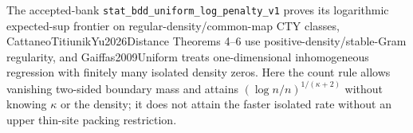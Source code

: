 The accepted-bank \texttt{stat\_bdd\_uniform\_log\_penalty\_v1} proves its logarithmic expected-sup frontier on regular-density/common-map CTY classes, CattaneoTitiunikYu2026Distance Theorems 4--6 use positive-density/stable-Gram regularity, and Gaiffas2009Uniform treats one-dimensional inhomogeneous regression with finitely many isolated density zeros. Here the count rule allows vanishing two-sided boundary mass and attains \((\log n/n)^{1/(\kappa+2)}\) without knowing \(\kappa\) or the density; it does not attain the faster isolated rate without an upper thin-site packing restriction.